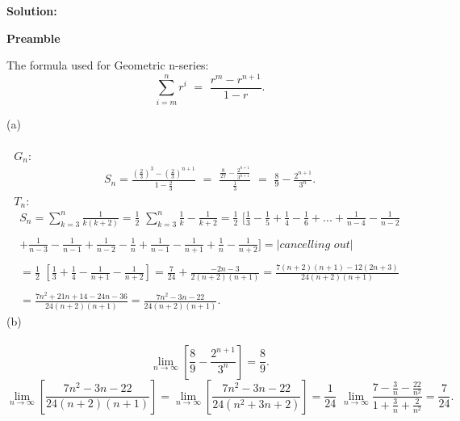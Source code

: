 \documentclass[a4paper, 12pt]{article}
\begin{document}
\bigbreak
\textbf{Solution:}
\bigbreak
\centerline{\textbf{Preamble}}
\begin{framed}
The formula used for Geometric n-series:
\begin{equation*}
\sum_{i=m}^{n} r^i \,\, = \,\, \frac{r^m - r^{n+1}}{1-r}.
\end{equation*}       
\end{framed}
\bigbreak
\bigbreak
(a)\\\\
 \,\, $G_n:$\\
\begin{align*}
S_n = \frac{\left(\frac{2}{3}\right)^3 - \left(\frac{2}{3}\right)^{n+1}}{1 - \frac{2}{3}}
\,\, = \,\, \frac{\frac{8}{27} - \frac{2^{n+1}}{3^{n+1}}}{\frac{1}{3}}
\,\, = \,\, \frac{8}{9} - \frac{2^{n+1}}{3^n}.
\end{align*}
\newpage
{} \,\, $T_n:$\\
\begin{gather*}
S_n = \sum_{k=3}^{n} \frac{1}{k(k+2)} = \frac{1}{2} \,\, \sum_{k=3}^{n} \frac{1}{k} - \frac{1}{k+2} = \frac{1}{2} \,\, [ \frac{1}{3} - \frac{1}{5} + \frac{1}{4} - \frac{1}{6} + ... +
\frac{1}{n-4} - \frac{1}{n-2} \\\\ + \frac{1}{n-3} - \frac{1}{n-1} + \frac{1}{n-2} - \frac{1}{n} +  \frac{1}{n-1} - \frac{1}{n+1} + \frac{1}{n} - \frac{1}{n+2} ]
 = | cancelling \,\, out | \\\\ =  \frac{1}{2} \,\, [ \frac{1}{3} + \frac{1}{4} - \frac{1}{n+1} - \frac{1}{n+2}] = \frac{7}{24} + \frac{-2n - 3}{2(n+2)(n+1)} = 
\frac{7(n+2)(n+1) - 12(2n+3)}{24(n+2)(n+1)} \\\\ = \frac{7n^2 + 21n + 14 - 24n - 36}{24(n+2)(n+1)} = \frac{7n^2 - 3n - 22}{24(n + 2)(n+1)}.
\end{gather*}
\bigbreak
(b) \\\\
\begin{equation*}
\lim_{n \to \infty} \left[ \frac{8}{9} - \frac{2^{n+1}}{3^n} \right] = \frac{8}{9}.
\end{equation*}
\bigbreak
\begin{equation*}
\lim_{n \to \infty} \left[ \frac{7n^2 - 3n - 22}{24(n + 2)(n+1)} \right]
= \lim_{n \to \infty} \left[ \frac{7n^2 - 3n - 22}{24(n^2 + 3n + 2)} \right] 
= \frac{1}{24} \,\, \lim_{n \to \infty} \frac{7 - \frac{3}{n} - \frac{22}{n^2}}{1 + 
\frac{3}{n} + \frac{2}{n^2}} = \frac{7}{24}.
\end{equation*}
\end{document}

